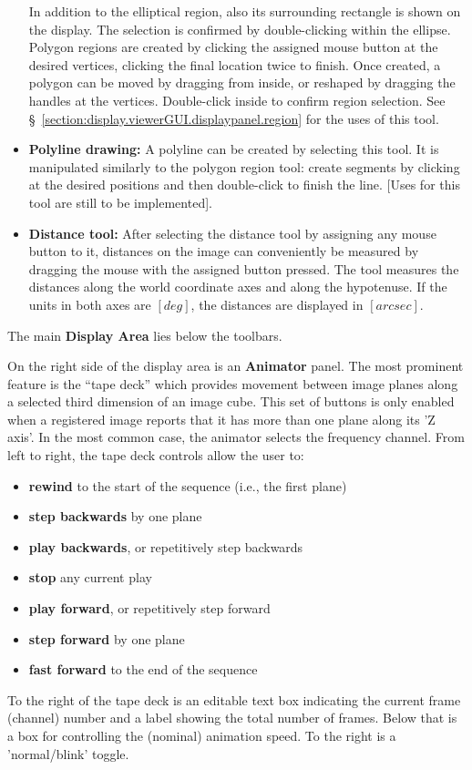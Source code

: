 \begin{itemize}
     In addition to the elliptical region, also its surrounding rectangle is
     shown on the display. The selection is confirmed by double-clicking within
     the ellipse.
     Polygon regions are created by clicking the assigned mouse button
     at the desired vertices, clicking the final location twice to finish.
     Once created, a polygon can be moved by dragging from inside, or
     reshaped by dragging the handles at the vertices.  Double-click inside to
     confirm region selection.
     See \S~\ref{section:display.viewerGUI.displaypanel.region} for the uses
     of this tool.
   \item {\bf Polyline drawing:}
     A polyline can be created by selecting this tool. It is manipulated
     similarly to the polygon region tool: create segments by clicking at
     the desired positions and then double-click to finish the line.
     [Uses for this tool are still to be implemented].
   \item {\bf Distance tool:}
     After selecting the distance tool by assigning any mouse button to it,
     distances on the image can conveniently be measured by dragging the
     mouse with the assigned button pressed. The tool measures the distances
     along the world coordinate axes and along the hypotenuse. If the units
     in both axes are $[deg]$, the distances are displayed in $[arcsec]$.
\end{itemize}

The main {\bf Display Area} lies below the toolbars.

On the right side of the display area is an {\bf Animator} panel.  The most prominent
feature is the ``tape deck'' which provides movement between image planes
along a selected third dimension of an image cube. This set of buttons is
only enabled when a registered image reports that it has more than one plane
along its 'Z axis'. In the most common case, the animator selects the frequency
channel. From left to right, the tape deck controls allow the user to:
\begin{itemize}
   \item {\bf rewind} to the start of the sequence (i.e., the first plane)
   \item {\bf step backwards} by one plane
   \item {\bf play backwards}, or repetitively step backwards
   \item {\bf stop} any current play
   \item {\bf play forward}, or repetitively step forward
   \item {\bf step forward} by one plane
   \item {\bf fast forward} to the end of the sequence
\end{itemize}
To the right of the tape deck is an editable text box indicating the
current frame (channel) number and a label showing the total number of
frames. Below that is a box for controlling the (nominal) animation
speed. To the right is a 'normal/blink' toggle.

